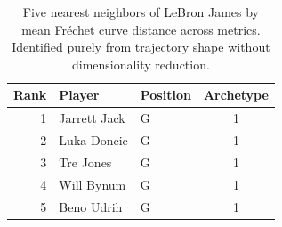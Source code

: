 \begin{table}[htbp]
  \centering\small
  \begin{tabular}{rllc}
    \toprule
    Rank & Player & Position & Archetype \\
    \midrule
    1 & Jarrett Jack & G & 1 \\
    2 & Luka Doncic & G & 1 \\
    3 & Tre Jones & G & 1 \\
    4 & Will Bynum & G & 1 \\
    5 & Beno Udrih & G & 1 \\
    \bottomrule
  \end{tabular}
  \caption{Five nearest neighbors of LeBron James by mean Fr\'{e}chet curve distance across metrics. Identified purely from trajectory shape without dimensionality reduction.}
  \label{tab:LeBron_James_frechet_curve_neighbors}
\end{table}

